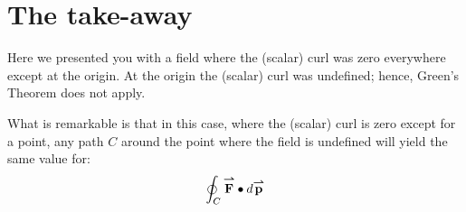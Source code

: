 \documentclass[noauthor,nooutcomes]{ximera}
\begin{document}
\newpage


\section{The take-away}

Here we presented you with a field where the (scalar) curl was zero
everywhere except at the origin.  At the origin the (scalar) curl was
undefined; hence, Green's Theorem does not apply.

What is remarkable is that in this case, where the (scalar) curl is
zero except for a point, any path $C$ around the point where the field
is undefined will yield the same value for:
\[
\oint_C {\overset{\boldsymbol{\rightharpoonup}}{\mathbf{F}}}\bullet\mathop{}\!d{\overset{\boldsymbol{\rightharpoonup}}{\mathbf{p}}}
\]
\end{document}

